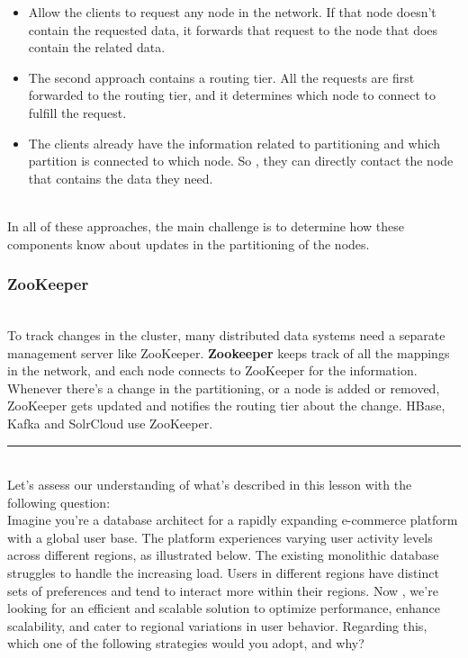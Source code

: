 \begin{itemize}
\item
\protect{}\label{X2mxsGxOrKadGDkZfEZk_}
Allow the clients to request any node in the network. If that node doesn't contain the requested data, it forwards that request to the node that does contain the related data.
\item
\protect{}\label{M_0FZQUihj3tdWWofKl_k}
The second approach contains a routing tier. All the requests are first forwarded to the routing tier, and it determines which node to connect to fulfill the request.
\item
\protect{}\label{JqefmjUao5TS93vzr5c2a}
The clients already have the information related to partitioning and which partition is connected to which node. So , they can directly contact the node that contains the data they need.
\end{itemize}
\\
In all of these approaches, the main challenge is to determine how these components know about updates in the partitioning of the nodes.

\subsubsection{ZooKeeper}\label{ZXsqJ4EG6TiD9OmSeF3gH}
\\
To track changes in the cluster, many distributed data systems need a separate management server like ZooKeeper. \textbf{Zookeeper} keeps track of all the mappings in the network, and each node connects to ZooKeeper for the information. Whenever there's a change in the partitioning, or a node is added or removed, ZooKeeper gets updated and notifies the routing tier about the change. HBase, Kafka and SolrCloud use ZooKeeper.

\begin{center}\rule{0.5\linewidth}{0.5pt}\end{center}
\\
Let's assess our understanding of what's described in this lesson with the following question:
\\
Imagine you're a database architect for a rapidly expanding e-commerce platform with a global user base. The platform experiences varying user activity levels across different regions, as illustrated below. The existing monolithic database struggles to handle the increasing load. Users in different regions have distinct sets of preferences and tend to interact more within their regions. Now , we're looking for an efficient and scalable solution to optimize performance, enhance scalability, and cater to regional variations in user behavior. Regarding this, which one of the following strategies would you adopt, and why?

